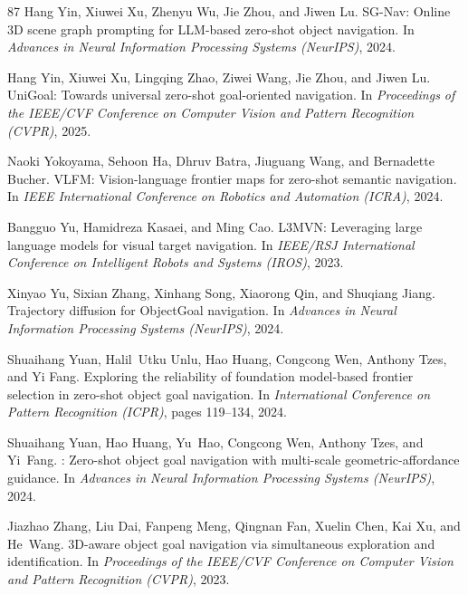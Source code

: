 \documentclass[10pt]{article}
\begin{document}
\begin{thebibliography}{87}
Hang Yin, Xiuwei Xu, Zhenyu Wu, Jie Zhou, and Jiwen Lu.
\newblock SG-Nav: Online 3D scene graph prompting for LLM-based zero-shot object navigation.
\newblock In \emph{Advances in Neural Information Processing Systems (NeurIPS)}, 2024.

Hang Yin, Xiuwei Xu, Lingqing Zhao, Ziwei Wang, Jie Zhou, and Jiwen Lu.
\newblock UniGoal: Towards universal zero-shot goal-oriented navigation.
\newblock In \emph{Proceedings of the IEEE/CVF Conference on Computer Vision and Pattern Recognition (CVPR)}, 2025.

Naoki Yokoyama, Sehoon Ha, Dhruv Batra, Jiuguang Wang, and Bernadette Bucher.
\newblock VLFM: Vision-language frontier maps for zero-shot semantic navigation.
\newblock In \emph{IEEE International Conference on Robotics and Automation (ICRA)}, 2024.

Bangguo Yu, Hamidreza Kasaei, and Ming Cao.
\newblock L3MVN: Leveraging large language models for visual target navigation.
\newblock In \emph{IEEE/RSJ International Conference on Intelligent Robots and Systems (IROS)}, 2023.

Xinyao Yu, Sixian Zhang, Xinhang Song, Xiaorong Qin, and Shuqiang Jiang.
\newblock Trajectory diffusion for {ObjectGoal} navigation.
\newblock In \emph{Advances in Neural Information Processing Systems (NeurIPS)}, 2024.

Shuaihang Yuan, Halil~Utku Unlu, Hao Huang, Congcong Wen, Anthony Tzes, and Yi Fang.
\newblock Exploring the reliability of foundation model-based frontier selection in zero-shot object goal navigation.
\newblock In \emph{International Conference on Pattern Recognition (ICPR)}, pages 119--134, 2024.

Shuaihang Yuan, Hao Huang, Yu~Hao, Congcong Wen, Anthony Tzes, and Yi~Fang.
: Zero-shot object goal navigation with multi-scale geometric-affordance guidance.
\newblock In \emph{Advances in Neural Information Processing Systems (NeurIPS)}, 2024.

Jiazhao Zhang, Liu Dai, Fanpeng Meng, Qingnan Fan, Xuelin Chen, Kai Xu, and He~Wang.
\newblock 3D-aware object goal navigation via simultaneous exploration and identification.
\newblock In \emph{Proceedings of the IEEE/CVF Conference on Computer Vision and Pattern Recognition (CVPR)}, 2023.


\end{thebibliography}
\end{document}
